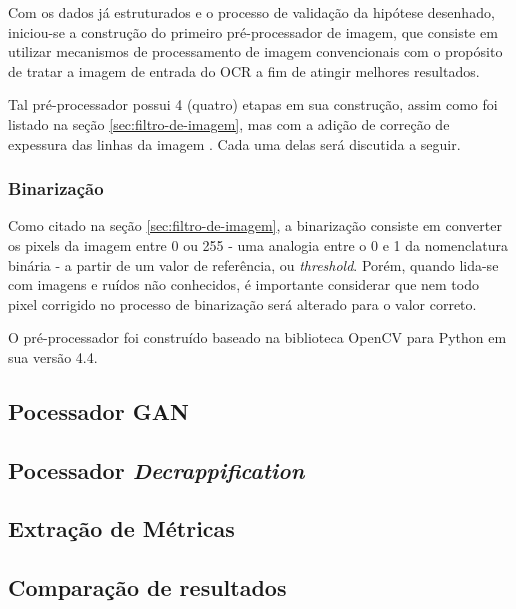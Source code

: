 Com os dados já estruturados e o processo de validação da hipótese desenhado, iniciou-se a construção do primeiro pré-processador de imagem, que consiste em utilizar mecanismos de processamento de imagem convencionais com o propósito de tratar a imagem de entrada do OCR a fim de atingir melhores resultados.

Tal pré-processador possui 4 (quatro) etapas em sua construção, assim como foi listado na seção \ref{sec:filtro-de-imagem}, mas com a adição de correção de expessura das linhas da imagem \cite{K3M-image-skeletonization}. Cada uma delas será discutida a seguir.


\subsubsection{Binarização}

Como citado na seção \ref{sec:filtro-de-imagem}, a binarização consiste em converter os pixels da imagem entre 0 ou 255 - uma analogia entre o 0 e 1 da nomenclatura binária - a partir de um valor de referência, ou \textit{threshold}. Porém, quando lida-se com imagens e ruídos não conhecidos, é importante considerar que nem todo pixel corrigido no processo de binarização será alterado para o valor correto.



O pré-processador foi construído baseado na biblioteca OpenCV para Python em sua versão 4.4.

\subsection{Pocessador GAN}
\subsection{Pocessador \textit{Decrappification}}
\subsection{Extração de Métricas}
\subsection{Comparação de resultados}